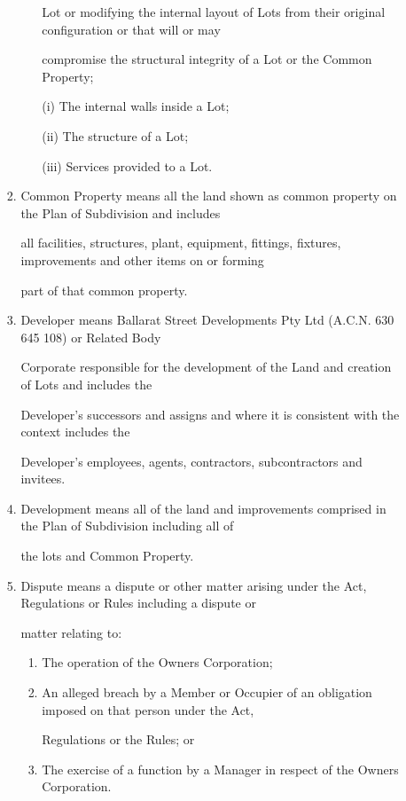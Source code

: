 \documentclass{article}
\begin{document}
\begin{enumerate}[label=\arabic*.]
\begin{enumerate}[label=\arabic{enumi}.\arabic*.]
\begin{enumerate}[label=(\arabic*)]
\begin{enumerate}[label=(\alph*)]
Lot or modifying the internal layout of Lots from their original configuration or that will or may 

compromise the structural integrity of a Lot or the Common Property; 

(i) The internal walls inside a Lot; 

\newpage

(ii) The structure of a Lot; 

(iii) Services provided to a Lot. 

\end{enumerate}
\item  Common Property means all the land shown as common property on the Plan of Subdivision and includes 

all facilities, structures, plant, equipment, fittings, fixtures, improvements and other items on or forming 

part of that common property. 

\item  Developer means Ballarat Street Developments Pty Ltd (A.C.N. 630 645 108) or Related Body 

Corporate responsible for the development of the Land and creation of Lots and includes the 

Developer’s successors and assigns and where it is consistent with the context includes the 

Developer’s employees, agents, contractors, subcontractors and invitees. 

\item  Development means all of the land and improvements comprised in the Plan of Subdivision including all of 

the lots and Common Property. 

\item  Dispute means a dispute or other matter arising under the Act, Regulations or Rules including a dispute or 

matter relating to: 

\begin{enumerate}[label=(\alph*)]
\item  The operation of the Owners Corporation; 

\item  An alleged breach by a Member or Occupier of an obligation imposed on that person under the Act, 

Regulations or the Rules; or 

\item  The exercise of a function by a Manager in respect of the Owners Corporation. 


\end{enumerate}
\end{enumerate}
\end{enumerate}
\end{enumerate}
\end{document}

